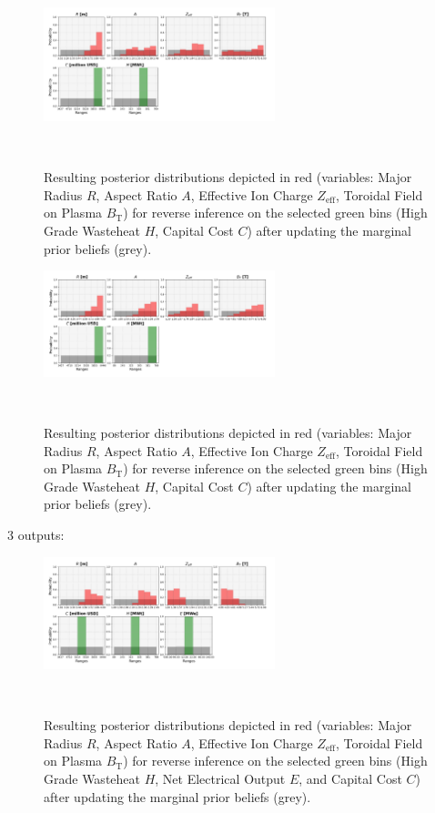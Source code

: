 \begin{figure}[ht]
    \centering
    \includegraphics[width=0.6\textwidth]{figures/TE_results/march_data/config(57)_2outputs_17.png}
    \caption{Resulting posterior distributions depicted in red (variables: Major Radius $R$, Aspect Ratio $A$, Effective Ion Charge $Z_{\text{eff}}$, Toroidal Field on Plasma $B_{\text{T}}$) for reverse
    inference on the selected green bins (High Grade Wasteheat $H$, Capital Cost $C$) after updating the marginal prior beliefs (grey).}~\label{fig:config(57)_2outputs_17}
\end{figure}

\begin{figure}[ht]
    \centering
    \includegraphics[width=0.6\textwidth]{figures/TE_results/march_data/config(57)_2outputs_18.png}
    \caption{Resulting posterior distributions depicted in red (variables: Major Radius $R$, Aspect Ratio $A$, Effective Ion Charge $Z_{\text{eff}}$, Toroidal Field on Plasma $B_{\text{T}}$) for reverse
    inference on the selected green bins (High Grade Wasteheat $H$, Capital Cost $C$) after updating the marginal prior beliefs (grey).}~\label{fig:config(57)_2outputs_18}
\end{figure}

3 outputs: 

\begin{figure}[ht]
    \centering
    \includegraphics[width=0.6\textwidth]{figures/TE_results/march_data/config(57)_3outputs_V2_1.png}
    \caption{Resulting posterior distributions depicted in red (variables: Major Radius $R$, Aspect Ratio $A$, Effective Ion Charge $Z_{\text{eff}}$, Toroidal Field on Plasma $B_{\text{T}}$) for reverse
    inference on the selected green bins (High Grade Wasteheat $H$, Net Electrical Output $E$, and  Capital Cost $C$) after updating the marginal prior beliefs (grey).}~\label{fig:config(57)_3outputs_V2_1}
\end{figure}

